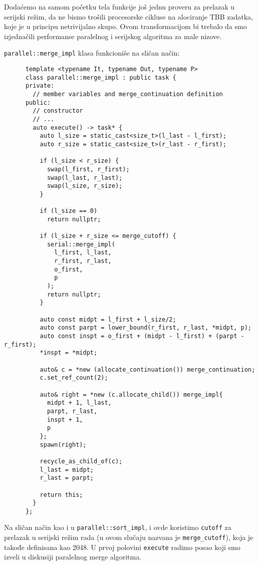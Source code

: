 \documentclass[a4paper,11pt]{article}
\begin{document}
    Dodaćemo na samom početku tela funkcije još jednu proveru za prelazak u serijski režim, da ne bismo
    trošili procesorske cikluse na alociranje TBB zadatka, koje je u principu netrivijalno skupo. Ovom transformacijom
    bi trebalo da smo izjednačili performanse paralelnog i serijskog algoritma za male nizove.\par
    \verb|parallel::merge_impl| klasa funkcioniše na sličan način:
    \begin{verbatim}
      template <typename It, typename Out, typename P>
      class parallel::merge_impl : public task {
      private:
        // member variables and merge_continuation definition
      public:
        // constructor
        // ...
        auto execute() -> task* {
          auto l_size = static_cast<size_t>(l_last - l_first);
          auto r_size = static_cast<size_t>(r_last - r_first);

          if (l_size < r_size) {
            swap(l_first, r_first);
            swap(l_last, r_last);
            swap(l_size, r_size);
          }

          if (l_size == 0)
            return nullptr;

          if (l_size + r_size <= merge_cutoff) {
            serial::merge_impl(
              l_first, l_last, 
              r_first, r_last, 
              o_first, 
              p
            );
            return nullptr;
          }

          auto const midpt = l_first + l_size/2;
          auto const parpt = lower_bound(r_first, r_last, *midpt, p);
          auto const inspt = o_first + (midpt - l_first) + (parpt - r_first);
          *inspt = *midpt;

          auto& c = *new (allocate_continuation()) merge_continuation;
          c.set_ref_count(2);

          auto& right = *new (c.allocate_child()) merge_impl{
            midpt + 1, l_last,
            parpt, r_last,
            inspt + 1, 
            p 
          };
          spawn(right);

          recycle_as_child_of(c);
          l_last = midpt;
          r_last = parpt;

          return this;
        }
      };
    \end{verbatim}
    Na sličan način kao i u \verb|parallel::sort_impl|, i ovde koristimo \verb|cutoff| za prelazak
    u serijski režim rada (u ovom slučaju nazvana je \verb|merge_cutoff|), koja je takođe definisana kao 2048.
    U prvoj polovini \verb|execute| radimo posao koji smo izveli u diskusiji paralelnog merge algoritma.
\end{document}
